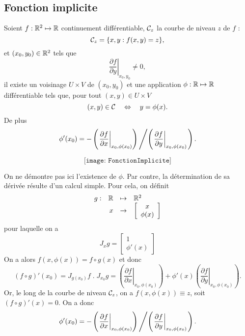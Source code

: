 \subsection{Fonction implicite}

\begin{theorem} \label{thm:fonctionImplicite}
  Soient $f : \mathbb{R}^2 \mapsto \mathbb{R}$ continuement différentiable, $\mathcal{C}_z$ la courbe de niveau $z$ de $f$ :
  $$
  \mathcal{C}_z = \{x, y: f(x, y) = z\},
  $$
  et $(x_0, y_0) \in \mathbb{R}^2$ tels que 
  $$
  \left.\frac{\partial f}{\partial y}\right|_{x_0, y_0} \neq 0,
  $$
  il existe un voisinage $U \times V$ de $(x_0, y_0)$ et une application $\phi : \mathbb{R} \mapsto \mathbb{R}$ différentiable tels que, pour tout $(x, y) \in U \times V$
  $$
  (x, y) \in \mathcal{C} \quad \Leftrightarrow \quad y = \phi(x).
  $$
  De plus
  $$
  \phi'(x_0) = - \left( \left. \frac{\partial f}{\partial x}\right|_{x_0, \phi(x_0)} \right) \left/ \left( \left. \frac{\partial f}{\partial y}\right|_{x_0, \phi(x_0)} \right. \right).
  $$
\end{theorem}

$$
\texttt{[image: FonctionImplicite]}
$$

\proof [partielle]
On ne démontre pas ici l'existence de $\phi$. Par contre, la détermination de sa dérivée résulte d'un calcul simple. Pour cela, on définit
$$
\begin{array}{rrcl}
  g : & \mathbb{R} & \mapsto & \mathbb{R}^2 \\
  & x & \to & \left[\begin{array}{c} x \\ \phi(x) \end{array}\right]
\end{array}
$$
pour laquelle on a
$$
J_x g = \left[\begin{array}{c} 1 \\ \phi'(x) \end{array}\right]
$$
On a alors $f(x, \phi(x))= f \circ g (x)$ et donc
$$
(f \circ g)'(x_0) 
= J_{g(x_0)}f \;.\; J_{x_0}g
= \left( \left. \frac{\partial f}{\partial x}\right|_{x_0, \phi(x_0)} \right) + \phi'(x) \left( \left. \frac{\partial f}{\partial y}\right|_{x_0, \phi(x_0)} \right).
$$
Or, le long de la courbe de niveau $\mathcal{C}_z$, on a $f(x, \phi(x)) \equiv z$, soit $(f \circ g)'(x) = 0$. On a donc
$$
\phi'(x_0) = - \left( \left. \frac{\partial f}{\partial x}\right|_{x_0, \phi(x_0)} \right) \left/ \left( \left. \frac{\partial f}{\partial y}\right|_{x_0, \phi(x_0)} \right. \right).
$$
\eproof

